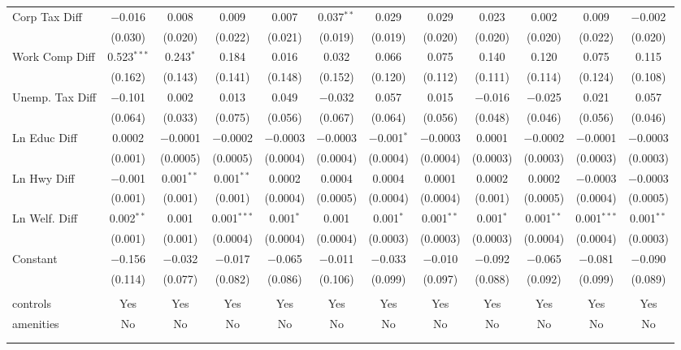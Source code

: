 \begin{table}[!htbp]
\begin{tabular}{@{\extracolsep{5pt}}lccccccccccc}
  Corp Tax Diff & $-$0.016 & 0.008 & 0.009 & 0.007 & 0.037$^{**}$ & 0.029 & 0.029 & 0.023 & 0.002 & 0.009 & $-$0.002 \\ 
  & (0.030) & (0.020) & (0.022) & (0.021) & (0.019) & (0.019) & (0.020) & (0.020) & (0.020) & (0.022) & (0.020) \\ 
  Work Comp Diff & 0.523$^{***}$ & 0.243$^{*}$ & 0.184 & 0.016 & 0.032 & 0.066 & 0.075 & 0.140 & 0.120 & 0.075 & 0.115 \\ 
  & (0.162) & (0.143) & (0.141) & (0.148) & (0.152) & (0.120) & (0.112) & (0.111) & (0.114) & (0.124) & (0.108) \\ 
  Unemp. Tax Diff & $-$0.101 & 0.002 & 0.013 & 0.049 & $-$0.032 & 0.057 & 0.015 & $-$0.016 & $-$0.025 & 0.021 & 0.057 \\ 
  & (0.064) & (0.033) & (0.075) & (0.056) & (0.067) & (0.064) & (0.056) & (0.048) & (0.046) & (0.056) & (0.046) \\ 
  Ln Educ Diff & 0.0002 & $-$0.0001 & $-$0.0002 & $-$0.0003 & $-$0.0003 & $-$0.001$^{*}$ & $-$0.0003 & 0.0001 & $-$0.0002 & $-$0.0001 & $-$0.0003 \\ 
  & (0.001) & (0.0005) & (0.0005) & (0.0004) & (0.0004) & (0.0004) & (0.0004) & (0.0003) & (0.0003) & (0.0003) & (0.0003) \\ 
  Ln Hwy Diff & $-$0.001 & 0.001$^{**}$ & 0.001$^{**}$ & 0.0002 & 0.0004 & 0.0004 & 0.0001 & 0.0002 & 0.0002 & $-$0.0003 & $-$0.0003 \\ 
  & (0.001) & (0.001) & (0.001) & (0.0004) & (0.0005) & (0.0004) & (0.0004) & (0.001) & (0.0005) & (0.0004) & (0.0005) \\ 
  Ln Welf. Diff & 0.002$^{**}$ & 0.001 & 0.001$^{***}$ & 0.001$^{*}$ & 0.001 & 0.001$^{*}$ & 0.001$^{**}$ & 0.001$^{*}$ & 0.001$^{**}$ & 0.001$^{***}$ & 0.001$^{**}$ \\ 
  & (0.001) & (0.001) & (0.0004) & (0.0004) & (0.0004) & (0.0003) & (0.0003) & (0.0003) & (0.0004) & (0.0004) & (0.0003) \\ 
  Constant & $-$0.156 & $-$0.032 & $-$0.017 & $-$0.065 & $-$0.011 & $-$0.033 & $-$0.010 & $-$0.092 & $-$0.065 & $-$0.081 & $-$0.090 \\ 
  & (0.114) & (0.077) & (0.082) & (0.086) & (0.106) & (0.099) & (0.097) & (0.088) & (0.092) & (0.099) & (0.089) \\ 
 \hline \\[-1.8ex] 
controls & Yes & Yes & Yes & Yes & Yes & Yes & Yes & Yes & Yes & Yes & Yes \\ 
amenities & No & No & No & No & No & No & No & No & No & No & No \\ 
\hline \\[-1.8ex] 
\hline 
\hline \\[-1.8ex] 
\end{tabular} 
\end{table} 

